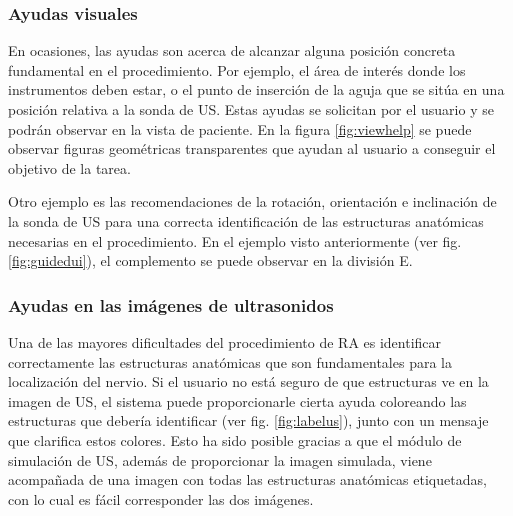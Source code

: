 \subsubsection{Ayudas visuales}

En ocasiones, las ayudas son acerca de alcanzar alguna posición concreta fundamental en el procedimiento. Por ejemplo, el área de interés donde los instrumentos deben estar, o el punto de inserción de la aguja que se sitúa en una posición relativa a la sonda de \ac{US}. Estas ayudas se solicitan por el usuario y se podrán observar en la vista de paciente. En la figura \ref{fig:viewhelp} se puede observar figuras geométricas transparentes que ayudan al usuario a conseguir el objetivo de la tarea.
 
 


Otro ejemplo es las recomendaciones de la rotación, orientación e inclinación de la sonda de \ac{US} para una correcta identificación de las estructuras anatómicas necesarias en el procedimiento. En el ejemplo visto anteriormente (ver fig. \ref{fig:guidedui}), el complemento se puede observar en la división E.


\subsubsection{Ayudas en las imágenes de ultrasonidos}
Una de las mayores dificultades del procedimiento de \ac{RA} es identificar correctamente las estructuras anatómicas que son fundamentales para la localización del nervio. Si el usuario no está seguro de que estructuras ve en la imagen de \ac{US}, el sistema puede proporcionarle cierta ayuda coloreando las estructuras que debería identificar (ver fig. \ref{fig:labelus}), junto con un mensaje que clarifica estos colores. Esto ha sido posible gracias a que el módulo de simulación de \ac{US}, además de proporcionar la imagen simulada, viene acompañada de una imagen con todas las estructuras anatómicas etiquetadas, con lo cual es fácil corresponder las dos imágenes.

 
 
